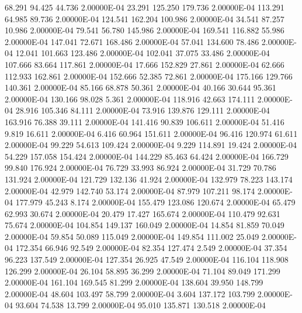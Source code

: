     68.291    94.425    44.736  2.00000E-04
    23.291   125.250   179.736  2.00000E-04
   113.291    64.985    89.736  2.00000E-04
   124.541   162.204   100.986  2.00000E-04
    34.541    87.257    10.986  2.00000E-04
    79.541    56.780   145.986  2.00000E-04
   169.541   116.882    55.986  2.00000E-04
   147.041    72.671   168.486  2.00000E-04
    57.041   134.600    78.486  2.00000E-04
    12.041   101.663   123.486  2.00000E-04
   102.041    37.075    33.486  2.00000E-04
   107.666    83.664   117.861  2.00000E-04
    17.666   152.829    27.861  2.00000E-04
    62.666   112.933   162.861  2.00000E-04
   152.666    52.385    72.861  2.00000E-04
   175.166   129.766   140.361  2.00000E-04
    85.166    68.878    50.361  2.00000E-04
    40.166    30.644    95.361  2.00000E-04
   130.166    98.028     5.361  2.00000E-04
   118.916    42.663   174.111  2.00000E-04
    28.916   105.346    84.111  2.00000E-04
    73.916   139.876   129.111  2.00000E-04
   163.916    76.388    39.111  2.00000E-04
   141.416    90.839   106.611  2.00000E-04
    51.416     9.819    16.611  2.00000E-04
     6.416    60.964   151.611  2.00000E-04
    96.416   120.974    61.611  2.00000E-04
    99.229    54.613   109.424  2.00000E-04
     9.229   114.891    19.424  2.00000E-04
    54.229   157.058   154.424  2.00000E-04
   144.229    85.463    64.424  2.00000E-04
   166.729    99.840   176.924  2.00000E-04
    76.729    33.993    86.924  2.00000E-04
    31.729    70.786   131.924  2.00000E-04
   121.729   132.136    41.924  2.00000E-04
   132.979    78.223   143.174  2.00000E-04
    42.979   142.740    53.174  2.00000E-04
    87.979   107.211    98.174  2.00000E-04
   177.979    45.243     8.174  2.00000E-04
   155.479   123.086   120.674  2.00000E-04
    65.479    62.993    30.674  2.00000E-04
    20.479    17.427   165.674  2.00000E-04
   110.479    92.631    75.674  2.00000E-04
   104.854   149.137   160.049  2.00000E-04
    14.854    81.859    70.049  2.00000E-04
    59.854    50.089   115.049  2.00000E-04
   149.854   111.002    25.049  2.00000E-04
   172.354    66.946    92.549  2.00000E-04
    82.354   127.474     2.549  2.00000E-04
    37.354    96.223   137.549  2.00000E-04
   127.354    26.925    47.549  2.00000E-04
   116.104   118.908   126.299  2.00000E-04
    26.104    58.895    36.299  2.00000E-04
    71.104    89.049   171.299  2.00000E-04
   161.104   169.545    81.299  2.00000E-04
   138.604    39.950   148.799  2.00000E-04
    48.604   103.497    58.799  2.00000E-04
     3.604   137.172   103.799  2.00000E-04
    93.604    74.538    13.799  2.00000E-04
    95.010   135.871   130.518  2.00000E-04
